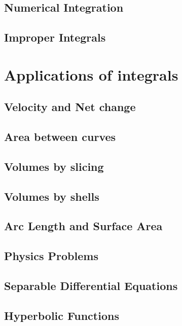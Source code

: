 \documentclass[symmetric,justified,marginals=justified,notoc]{tufte-book}
\theoremstyle{mytheoremstyle}
\begin{document}
	\section{Numerical Integration}
	\lipsum
	
	\section{Improper Integrals}
	\lipsum[31-50]
	
	
	
\chapter{Applications of integrals}

	\section{Velocity and Net change}
	\lipsum[31-50]
	
	\section{Area between curves}
	\lipsum[31-50]
	
	\section{Volumes by slicing}
	\lipsum[31-50]
	
	\section{Volumes by shells}
	\lipsum[31-50]

	\section{Arc Length and Surface Area}
	\lipsum[31-50]	
	
	\section{Physics Problems}
	\lipsum[31-50]
	
	\section{Separable Differential Equations}
	\lipsum[31-50]
	
	\section{Hyperbolic Functions}
	\lipsum[31-50]
	
\end{document}
